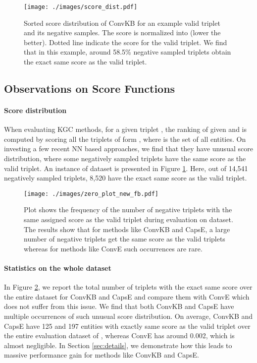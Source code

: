 \documentclass[11pt,a4paper]{article}
\begin{document}
\begin{figure}[t]
	\centering
	\texttt{[image: ./images/score\_dist.pdf]}
	\caption{\label{fig:score_dist} Sorted score distribution of ConvKB for an example valid triplet and its negative samples. The score is normalized into  (lower the better). Dotted line indicate the score for the valid triplet. We find that in this example, around 58.5\% negative sampled triplets obtain the exact same score as the valid triplet. }  
\end{figure}



\subsection{Observations on Score Functions}
\label{sec:score_dist}

\paragraph{Score distribution}
When evaluating KGC methods, for a given triplet , the ranking of  given  and  is computed by scoring all the triplets of form , where  is the set of all entities. On investing a few recent NN based approaches, we find that they have unusual score distribution, where some negatively sampled triplets have the same score as the valid triplet. An instance of \datafb{} dataset is presented in Figure \ref{fig:score_dist}. Here, out of 14,541 negatively sampled triplets, 8,520 have the exact same score as the valid triplet.



\begin{figure}[t]
	\centering
	\texttt{[image: ./images/zero\_plot\_new\_fb.pdf]}
	\caption{\label{fig:samescr_plot}Plot shows the frequency of the number of negative triplets with the same assigned score as the valid triplet during evaluation on \datafb{} dataset. The results show that for methods like ConvKB and CapsE, a large number of negative triplets get the same score as the valid triplets whereas for methods like ConvE such occurrences are rare.
	} \end{figure}

\paragraph{Statistics on the whole dataset}
In Figure \ref{fig:samescr_plot}, we report the total number of triplets with the exact same score over the entire dataset for ConvKB \cite{convkb} and CapsE \cite{capse} and compare them with ConvE \cite{conve} which does not suffer from this issue. We find that both ConvKB and CapsE have multiple occurrences of such unusual score distribution. On average, ConvKB and CapsE have 125 and 197 entities with exactly same score as the valid triplet over the entire evaluation dataset of \datafb{}, whereas ConvE has around 0.002, which is almost negligible. In Section \ref{sec:details}, we demonstrate how this leads to massive performance gain for methods like ConvKB and CapsE. 
\end{document}
